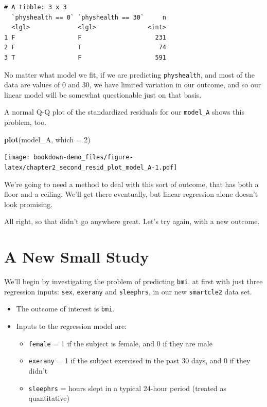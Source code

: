 \documentclass[]{book}
\newenvironment{Shaded}{\begin{snugshade}}{\end{snugshade}}
\newcommand{\KeywordTok}[1]{\textcolor[rgb]{0.13,0.29,0.53}{\textbf{#1}}}
\newcommand{\DataTypeTok}[1]{\textcolor[rgb]{0.13,0.29,0.53}{#1}}
\newcommand{\DecValTok}[1]{\textcolor[rgb]{0.00,0.00,0.81}{#1}}
\newcommand{\NormalTok}[1]{#1}
\providecommand{\tightlist}{%
  \setlength{\itemsep}{0pt}\setlength{\parskip}{0pt}}
\theoremstyle{definition}
\theoremstyle{definition}
\theoremstyle{definition}
\theoremstyle{remark}
\begin{document}
\begin{verbatim}
# A tibble: 3 x 3
  `physhealth == 0` `physhealth == 30`     n
  <lgl>             <lgl>              <int>
1 F                 F                    231
2 F                 T                     74
3 T                 F                    591
\end{verbatim}

No matter what model we fit, if we are predicting \texttt{physhealth},
and most of the data are values of 0 and 30, we have limited variation
in our outcome, and so our linear model will be somewhat questionable
just on that basis.

A normal Q-Q plot of the standardized residuals for our
\texttt{model\_A} shows this problem, too.

\begin{Shaded}
\begin{Highlighting}[]
\KeywordTok{plot}\NormalTok{(model_A, }\DataTypeTok{which =} \DecValTok{2}\NormalTok{)}
\end{Highlighting}
\end{Shaded}

\texttt{[image: bookdown-demo\_files/figure-latex/chapter2\_second\_resid\_plot\_model\_A-1.pdf]}

We're going to need a method to deal with this sort of outcome, that has
both a floor and a ceiling. We'll get there eventually, but linear
regression alone doesn't look promising.

All right, so that didn't go anywhere great. Let's try again, with a new
outcome.

\section{A New Small Study}\label{a-new-small-study}

We'll begin by investigating the problem of predicting \texttt{bmi}, at
first with just three regression inputs: \texttt{sex}, \texttt{exerany}
and \texttt{sleephrs}, in our new \texttt{smartcle2} data set.

\begin{itemize}
\tightlist
\item
  The outcome of interest is \texttt{bmi}.
\item
  Inputs to the regression model are:

  \begin{itemize}
  \tightlist
  \item
    \texttt{female} = 1 if the subject is female, and 0 if they are male
  \item
    \texttt{exerany} = 1 if the subject exercised in the past 30 days,
    and 0 if they didn't
  \item
    \texttt{sleephrs} = hours slept in a typical 24-hour period (treated
    as quantitative)
  \end{itemize}
\end{itemize}
\end{document}
